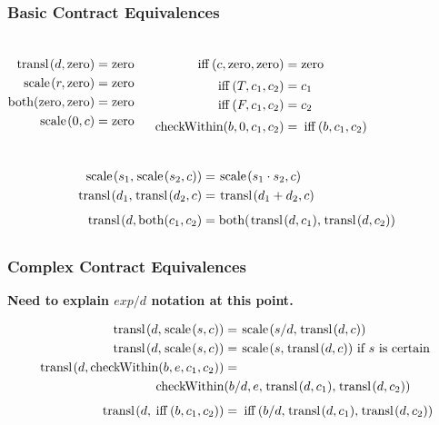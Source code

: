 \documentclass[xcolor=dvipsnames,11pt]{beamer}
\newcommand{\ttt}[1]{\mbox{\cd{#1}}}
\newcommand{\zero}{\ttt{zero}}
\newcommand{\scale}{\ttt{scale}}
\newcommand{\transl}{\ttt{transl}}
\newcommand{\both}{\ttt{both}}
\newcommand{\ifff}{\ttt{iff}}
\newcommand{\checkWithin}{\ttt{checkWithin}}
\begin{document}
\begin{frame}\frametitle{Basic Contract Equivalences}{\footnotesize

\begin{columns}
\begin{align*}
    \transl(d,\zero)             &=  \zero\\
    \scale(r,\zero)              &=  \zero\\
    \both(\zero,\zero)           &=  \zero\\
    \scale(0,c)                  &=  \zero\\
\end{align*}

\begin{align*}
    \ifff(c,\zero,\zero)        &= \zero\\[0.5ex]
    \ifff(T,c_1,c_2)            &=  c_1\\
    \ifff(F,c_1,c_2)            &=  c_2\\[0.5ex]
    \checkWithin(b,0,c_1,c_2)   &= \ifff(b,c_1,c_2) \\
\end{align*}
\end{columns}

\begin{align*}
    \scale(s_1,\scale(s_2,c))    &=  \scale(s_1\cdot s_2,c)\\
    \transl(d_1,\transl(d_2,c)   &=  \transl(d_1+d_2,c)\\[1ex]
    \transl(d,\both(c_1,c_2)     &=  \both(\transl(d,c_1),\transl(d,c_2))\\[1ex]
\end{align*}

}\end{frame}


\begin{frame}[t] \frametitle{Complex Contract Equivalences} {\footnotesize

\textbf{Need to explain $ exp/d$ notation at this point.}

\begin{align*}
    \transl(d,\scale(s,c))       &=  \scale(s/d,\transl(d,c))\\
    \transl(d,\scale(s,c))       &=  \scale(s,\transl(d,c))\  \mbox{if } s \mbox{ is certain}\\
%
  \transl(d,\checkWithin (b, e, c_1, c_2))  &=  \\
                             \checkWithin &(b/d, e, \transl(d,c_1), \transl(d,c_2))\\[1ex]
  \transl(d,\ifff(b,c_1,c_2))  &=  \ifff(b/d, \transl(d,c_1), \transl(d,c_2))\\
\end{align*}

}\end{frame}
\end{document}
